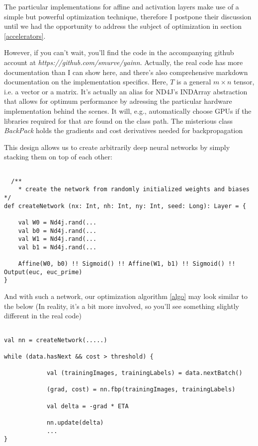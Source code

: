 \documentclass[]{report}
\begin{document}
The particular implementations for affine and activation layers make use of a simple but powerful optimization technique, therefore I postpone their discussion until we had the opportunity to address the subject of optimization in section \ref{accelerators}. 

However, if you can't wait, you'll find the code in the accompanying github account at \emph{https://github.com/smurve/yainn}. Actually, the real code has more documentation than I can show here, and there's also comprehensive markdown documentation on the implementation specifics. Here, \(T\) is a general \(m \times n\) tensor, i.e. a vector or a matrix. It's actually an alias for ND4J's INDArray abstraction that allows for optimum performance by adressing the particular hardware implementation behind the scenes. It will, e.g., automatically choose GPUs if the libraries required for that are found on the class path. The misterious class \emph{BackPack} holds the gradients and cost derivatives needed for backpropagation

This design allows us to create arbitrarily deep neural networks by simply stacking them on top of each other:

\begin{lstlisting}[label=vectors_in_scala,caption=Chaining layers to form a neural network] 

  /**
	* create the network from randomly initialized weights and biases
*/
def createNetwork (nx: Int, nh: Int, ny: Int, seed: Long): Layer = {
	
	val W0 = Nd4j.rand(...
	val b0 = Nd4j.rand(...
	val W1 = Nd4j.rand(...
	val b1 = Nd4j.rand(...
	
	Affine(W0, b0) !! Sigmoid() !! Affine(W1, b1) !! Sigmoid() !! Output(euc, euc_prime)
}
\end{lstlisting}

\bigskip

And with such a network, our optimization algorithm \ref{algo} may look similar to the below (In reality, it's a bit more involved, so you'll see something slightly different in the real code)

\begin{lstlisting}[label=vectors_in_scala,caption=Optimizing a neural network] 

val nn = createNetwork(.....)

while (data.hasNext && cost > threshold) {
	
			val (trainingImages, trainingLabels) = data.nextBatch()
	
			(grad, cost) = nn.fbp(trainingImages, trainingLabels)

			val delta = -grad * ETA

			nn.update(delta)
			...
}
\end{lstlisting}
\end{document}
